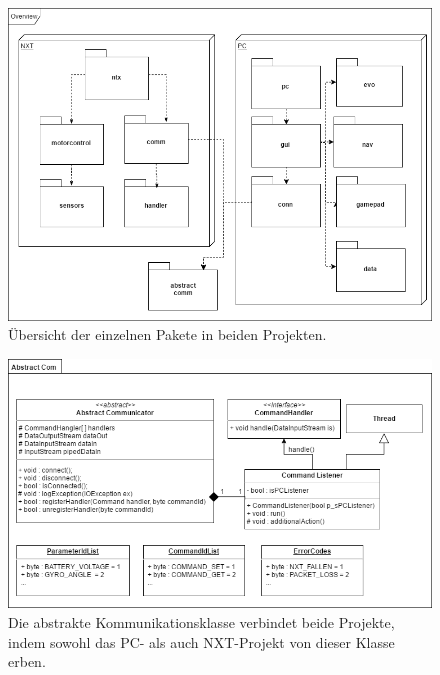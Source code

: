 \documentclass[oneside,abstractoff,a4paper]{scrartcl}
\begin{document}
\begin{figure}
	\includegraphics[width=\textwidth]{Overview.png}
    \caption{Übersicht der einzelnen Pakete in beiden Projekten.}
    \label{fig:Overview}
\end{figure}

\begin{figure}
	\includegraphics[width=\textwidth]{AbstractCom.png}
    \caption{Die abstrakte Kommunikationsklasse verbindet beide Projekte, indem sowohl das PC- als auch NXT-Projekt von dieser Klasse erben.}
    \label{fig:AbstractCom}
\end{figure}
\end{document}
